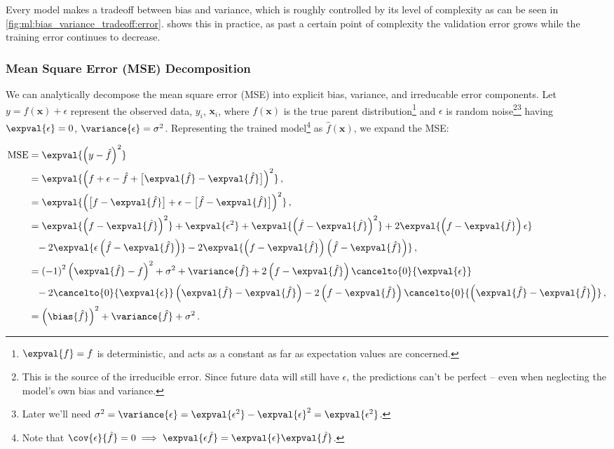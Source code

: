 Every model makes a tradeoff between bias and variance,
which is roughly controlled by its level of complexity
as can be seen in \cref{fig:ml:bias_variance_tradeoff:error}.
 shows this in practice,
as past a certain point of complexity the validation error grows
while the training error continues to decrease.

\subsubsection{Mean Square Error (MSE) Decomposition}
\label{ml:general:bias_variance_tradeoff:decop}

We can analytically decompose the mean square error (MSE) into explicit
bias, variance, and irreducable error components.
Let $y = f\left(\mathbf{x}\right) + \epsilon$ represent
the observed data, $y_{i}$, $\mathbf{x}_{i}$,
where $f\left(\mathbf{x}\right)$ is the true parent distribution\footnote{$\expval{f} = f$ is deterministic,
and acts as a constant as far as expectation values are concerned.} and
$\epsilon$ is random noise\footnote{This is the source of the irreducible error.
Since future data will still have $\epsilon$, the predictions can't be perfect
-- even when neglecting the model's own bias and variance.}\footnote{Later we'll need
$\sigma^{2} = \variance{\epsilon} = \expval{\epsilon^{2}} - \expval{\epsilon}^{2} = \expval{\epsilon^{2}}$.} having
$\expval{\epsilon} = 0$, $\variance{\epsilon} = \sigma^{2}$.
Representing the trained model\footnote{Note
that $\cov{\epsilon}{\hat{f}} = 0 \implies \expval{\epsilon \hat{f}} = \expval{\epsilon} \expval{\hat{f}}$.} as
$\hat{f}\left(\mathbf{x}\right)$, we expand the MSE:

\begin{subequations} \label{eq:bias_variance_tradeoff:decop}
\begin{align}
\text{MSE} &= \expval{\left(y-\hat{f}\right)^{2}} \\
&= \expval{\left(f + \epsilon - \hat{f} + \big[\expval{\hat{f}}-\expval{\hat{f}}\big]\right)^{2}}\,, \\
&= \expval{\left(\big[f - \expval{\hat{f}}\big] + \epsilon - \big[\hat{f} - \expval{\hat{f}}\big]\right)^{2}}\,, \\
&= \expval{\left(f-\expval{\hat{f}}\right)^{2}}
+\expval{\epsilon^{2}}
+\expval{\left(\hat{f}-\expval{\hat{f}}\right)^{2}}
+2\expval{\left(f-\expval{\hat{f}}\right)\epsilon} \\
&\hphantom{=}-2\expval{\epsilon\left(\hat{f}-\expval{\hat{f}}\right)}
-2\expval{\left(f-\expval{\hat{f}}\right)\left(\hat{f}-\expval{\hat{f}}\right)}\,, \\
&= \left(-1\right)^{2}\left(\expval{\hat{f}}-f\right)^{2} +\sigma^{2} + \variance{\hat{f}}
+2\left(f-\expval{\hat{f}}\right)\cancelto{0}{\expval{\epsilon}} \\
&\hphantom{=}-2\cancelto{0}{\expval{\epsilon}}\left(\expval{\hat{f}}-\expval{\hat{f}}\right)
-2\left(f-\expval{\hat{f}}\right)\cancelto{0}{\left(\expval{\hat{f}}-\expval{\hat{f}}\right)}\,, \\
&= \left(\bias{\hat{f}}\right)^{2} + \variance{\hat{f}} + \sigma^{2}\,.
\end{align}
\end{subequations}

